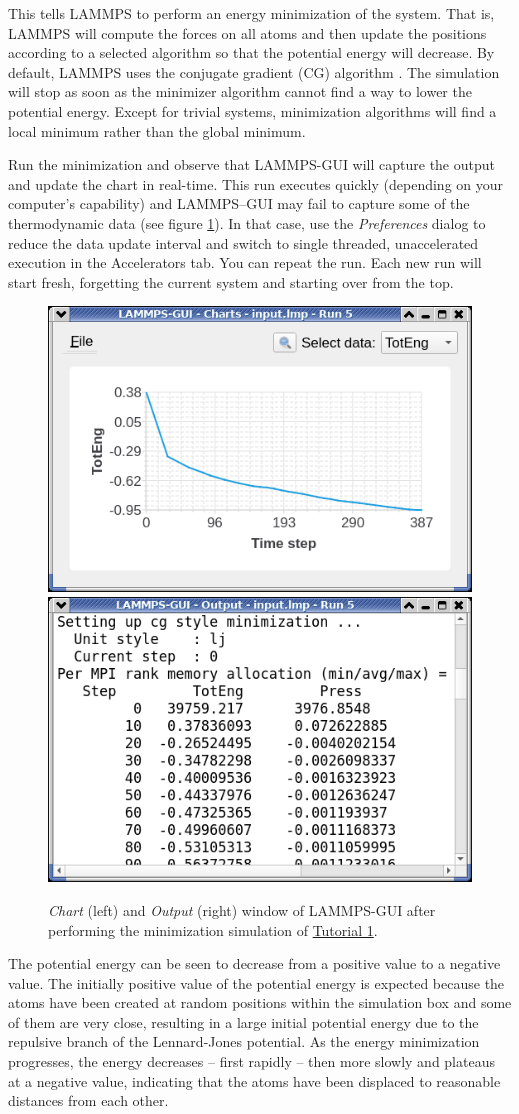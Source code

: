 \documentclass[9pt,tutorial]{livecoms}
\begin{document}
This tells LAMMPS to perform an energy minimization of the system.  That
is, LAMMPS will compute the forces on all atoms and then update the
positions according to a selected algorithm so that the potential energy
will decrease.  By default, LAMMPS uses the conjugate gradient (CG)
algorithm \cite{hestenes1952methods}.  The simulation will stop as soon
as the minimizer algorithm cannot find a way to lower the potential
energy.  Except for trivial systems, minimization algorithms will find a
local minimum rather than the global minimum.

Run the minimization and observe that LAMMPS-GUI will capture the output
and update the chart in real-time.  This run executes quickly (depending
on your computer's capability) and LAMMPS--GUI may fail to capture some
of the thermodynamic data (see figure \ref{fig:chart-log}).  In that
case, use the \textit{Preferences} dialog to reduce the data update
interval and switch to single threaded, unaccelerated execution in the
Accelerators tab.  You can repeat the run.  Each new run will start
fresh, forgetting the current system and starting over from the top.

\begin{figure}
\centering
\includegraphics[width=0.45\linewidth]{chart-1}
\includegraphics[width=0.45\linewidth]{output-1}
\caption{\textit{Chart} (left) and \textit{Output} (right) window of LAMMPS-GUI after performing
  the minimization simulation of \hyperref[lennard-jones-label]{Tutorial 1}.}
\label{fig:chart-log}
\end{figure}

The potential energy can be seen to decrease from a positive value to a
negative value.  The initially positive value of the potential energy is
expected because the atoms have been created at random positions within
the simulation box and some of them are very close, resulting in a large
initial potential energy due to the repulsive branch of the
Lennard-Jones potential.  As the energy minimization progresses, the
energy decreases -- first rapidly -- then more slowly and plateaus at
a negative value, indicating that the atoms have been displaced to
reasonable distances from each other.
\end{document}
